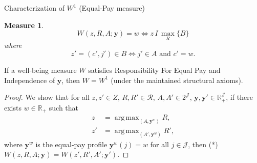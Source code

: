 \documentclass[10pt]{beamer}
\DeclareMathOperator*{\argmax}{arg\,max}
\newtheorem{Measure}{Measure}
\begin{document}
\begin{frame}[allowframebreaks]{Characterization of $W^1$ (Equal-Pay measure)}
\hypertarget{char:w1}{}%
\hyperlink{tab:classification}{}

\scriptsize
\begin{Measure}
    \begin{equation*}
\label{ }
W(z, R, A;\mathbf{y})=w\Leftrightarrow z\,I\,\max_R\{B\}
\end{equation*}
where
\begin{equation*}
\label{ }
z'=(c',j')\in B\Leftrightarrow j'\in A \textrm{ and } c'=w.
\end{equation*}
\end{Measure}
\begin{theorem}
If a well-being measure $W$ satisfies Responsibility For Equal Pay and
Independence of $\mathbf y$, then $W=W^1$ (under the maintained structural axioms).
\end{theorem}
\framebreak
\begin{proof}
We show that for all $z,z'\in Z$, $R,R'\in\mathcal R$, $A,A'\in 2^{\mathcal J}$,
$\mathbf y,\mathbf y'\in\mathbb R_+^{\mathcal J}$, if there exists
$w\in\mathbb R_+$ such that
\begin{align*}
z&=\argmax_{(A,\mathbf y^w)}R,\\
z'&=\argmax_{(A',\mathbf y^w)}R',\end{align*}
where $\mathbf y^w$ is the equal-pay profile $\mathbf y^w(j)=w$ for all
$j\in\mathcal J$, then (*) $W(z,R,A;\mathbf y)=W(z',R',A';\mathbf y')$.


\end{proof}
\end{frame}
\end{document}
